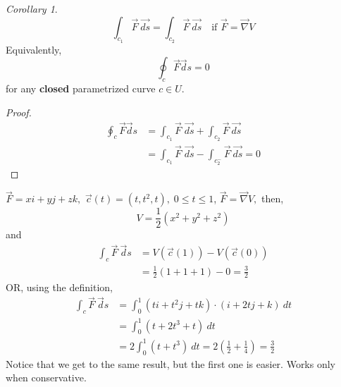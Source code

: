\documentclass[12pt]{book}
\theoremstyle{definition}
\theoremstyle{remark}
\newtheorem{corollary}{Corollary}[theorem]
\begin{document}
  \begin{corollary}$$\int_{{c_1}}^{{}} \vec{{F}}  \: \vec{d{s}} = \int_{{c_2}}^{} {\vec{{F}} } \:\vec{{ds}}  \quad \text{if } \vec F = \vec \nabla V $$
    Equivalently, $$\oint_c \vec F \vec ds = 0 $$ for any \textbf{closed} parametrized curve $c \in U$.
  \end{corollary}
  \begin{proof}
    \begin{equation*}
      \begin{split}
      \oint_c \vec F \vec ds &= \int_{{c_1}}^{{}} \vec F \; \vec{{ds}} + \int_{{c_2}}^{{}} \vec F  \: \vec{ds} {} \\ 
        &= \int_{{c_1}}^{{}} \vec F \; \vec{{ds}} - \int_{{c_2^-}}^{{}} \vec F  \: \vec{ds}  = 0
      \end{split} 
    \end{equation*} 
  \end{proof}
  \begin{example}$\vec{{F}} = x i + y j + z k ,$ $\vec{{c}} (t) = (t, t^2, t ), \; 0 \leq t \leq 1$, $\vec{{F}}  = \vec{{\nabla }} V,$ then, 
    $$V = \frac{1}{2} (x^2 + y^2 + z^2) $$
    and 
    \begin{equation*}
      \begin{split}
        \int_{{c}}^{{}} {\vec{{F}} } \: \vec d{s}  &= V(\vec{{c}} (1))- V(\vec{{c}} (0)) \\ 
        &= \frac{1}{2} (1+ 1+1 ) - 0 = \frac{3}{2} 
      \end{split}
    \end{equation*}
    OR, using the definition, 
\begin{equation*}
      \begin{split}
        \int_{{c}}^{{}} {\vec{{F}} } \: \vec d{s}  &= \int_{{0}}^{{1}} (ti + t^2j + tk) \cdot (i + 2tj + k) \: d{t}  \\ 
        & = \int_{{0}}^{{1}} (t + 2t^3 + t ) \: d{t} \\ 
        & = 2 \int_{{0}}^{{1}} (t+ t^3) \: d{t} = 2(\frac{1}{2} + \frac{1}{4}  ) = \frac{3}{2} 
      \end{split}
    \end{equation*}
    Notice that we get to the same result, but the first one is easier. Works only when conservative.
  \end{example}
\end{document}
